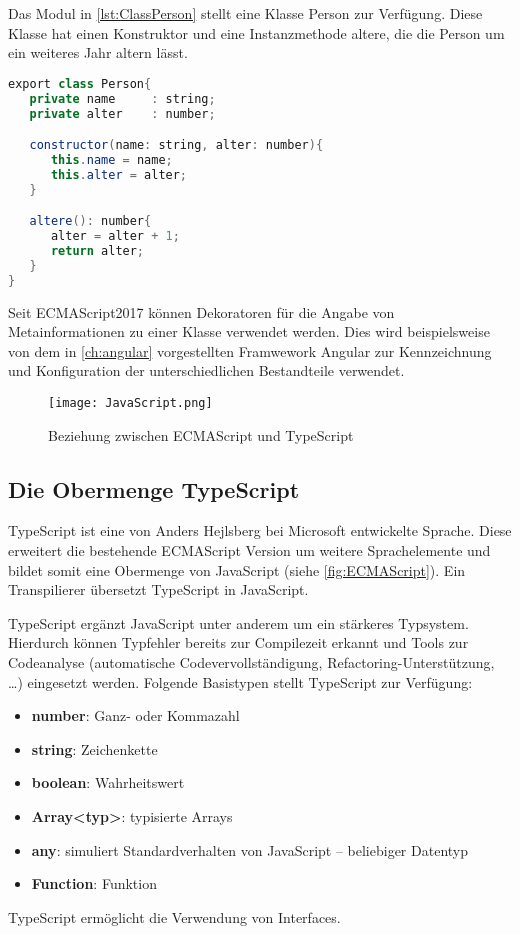 Das Modul in \autoref{lst:ClassPerson} stellt eine Klasse Person zur Verfügung. Diese Klasse hat einen Konstruktor und eine Instanzmethode altere, die die Person um ein weiteres Jahr altern lässt.

\begin{lstlisting}[caption=Eine Klasse Person wird von einem Modul bereitgestellt , label=lst:ClassPerson, language=Java]
export class Person{
   private name 	: string;
   private alter 	: number;

   constructor(name: string, alter: number){
      this.name = name;
      this.alter = alter;
   }

   altere(): number{
      alter = alter + 1;
      return alter;
   }
}
\end{lstlisting}

Seit ECMAScript2017 können Dekoratoren für die Angabe von Metainformationen zu einer Klasse verwendet werden. Dies wird beispielsweise von dem in \autoref{ch:angular} vorgestellten Framwework Angular zur Kennzeichnung und Konfiguration der unterschiedlichen Bestandteile verwendet.\autocites[vgl.][30\psqq]{Woiwode.2018} 

\begin{figure}[h]
	\centering
	\texttt{[image: JavaScript.png]}
	\caption{Beziehung zwischen ECMAScript und TypeScript} 
	\label{fig:ECMAScript}
\end{figure}

\subsection{Die Obermenge TypeScript}
TypeScript ist eine von Anders Hejlsberg bei Microsoft entwickelte Sprache. Diese erweitert die bestehende ECMAScript Version um weitere Sprachelemente und bildet somit eine Obermenge von JavaScript (siehe \autoref{fig:ECMAScript}). Ein Transpilierer übersetzt TypeScript in JavaScript. 

TypeScript ergänzt JavaScript unter anderem um ein stärkeres Typsystem. Hierdurch können Typfehler bereits zur Compilezeit erkannt und Tools zur Codeanalyse (automatische Codevervollständigung, Refactoring-Unterstützung, …) eingesetzt werden.\autocites[vgl.][27\psqq]{Woiwode.2018}[vgl.][13\psqq]{Steyer.2017}[vgl.][10]{Zeigermann.2016} Folgende Basistypen stellt TypeScript zur Verfügung: \autocites[vgl.][34\psqq]{Woiwode.2018}[vgl.][16\psqq]{Steyer.2017}

\begin{itemize}
	\item  \textbf{number}: Ganz- oder Kommazahl
	\item \textbf{string}:  Zeichenkette
	\item \textbf{boolean}: Wahrheitswert
	\item \textbf{Array<typ>}: typisierte Arrays
	\item \textbf{any}: simuliert Standardverhalten von JavaScript  – beliebiger Datentyp
	\item \textbf{Function}: Funktion
\end{itemize}
TypeScript ermöglicht die Verwendung von Interfaces. \autocites[vgl.][40\psq]{Woiwode.2018}

